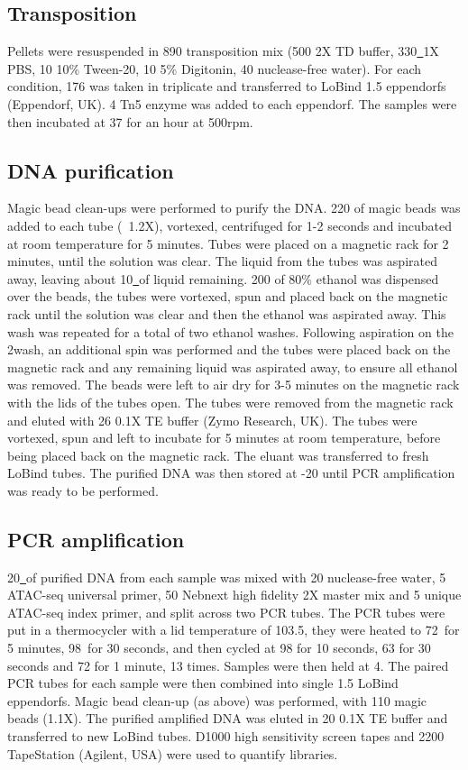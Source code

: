 \subsection{Transposition}
Pellets were resuspended in 890\ul{} transposition mix (500\ul{} 2X TD buffer, 330\ul\ 1X PBS, 10\ul{} 10\% Tween-20, 10\ul{} 5\% Digitonin, 40\ul{} nuclease-free water).
For each condition, 176\ul{} was taken in triplicate and transferred to LoBind 1.5\ml{} eppendorfs (Eppendorf, UK).
4\ul{} Tn5 enzyme was added to each eppendorf.
The samples were then incubated at 37\C{} for an hour at 500rpm.

\subsection{DNA purification}
Magic bead clean-ups were performed to purify the DNA.
220\ul{} of magic beads was added to each tube (~1.2X), vortexed, centrifuged for 1-2 seconds and incubated at room temperature for 5 minutes.
Tubes were placed on a magnetic rack for 2 minutes, until the solution was clear.
The liquid from the tubes was aspirated away, leaving about 10\ul\ of liquid remaining.
200\ul{} of 80\% ethanol was dispensed over the beads, the tubes were vortexed, spun and placed back on the magnetic rack until the solution was clear and then the ethanol was aspirated away.
This wash was repeated for a total of two ethanol washes.
Following aspiration on the 2\nd wash, an additional spin was performed and the tubes were placed back on the magnetic rack and any remaining liquid was aspirated away, to ensure all ethanol was removed.
The beads were left to air dry for 3-5 minutes on the magnetic rack with the lids of the tubes open.
The tubes were removed from the magnetic rack and eluted with 26\ul{} 0.1X TE buffer (Zymo Research, UK).
The tubes were vortexed, spun and left to incubate for 5 minutes at room temperature, before being placed back on the magnetic rack.
The eluant was transferred to fresh LoBind tubes.
The purified DNA was then stored at -20\C{} until PCR amplification was ready to be performed.

\subsection{PCR amplification}
20\ul\ of purified DNA from each sample was mixed with 20\ul{} nuclease-free water, 5\ul{} ATAC-seq universal primer, 50\ul{} Nebnext high fidelity 2X master mix and 5\ul{} unique ATAC-seq index primer, and split across two PCR tubes.
The PCR tubes were put in a thermocycler with a lid temperature of 103.5\C{}, they were heated to 72\C\ for 5 minutes, 98\C\ for 30 seconds, and then cycled at 98\C{} for 10 seconds, 63\C{} for 30 seconds and 72\C{} for 1 minute, 13 times.
Samples were then held at 4\C{}.
The paired PCR tubes for each sample were then combined into single 1.5\ml{} LoBind eppendorfs.
Magic bead clean-up (as above) was performed, with 110\ul{} magic beads (1.1X).
The purified amplified DNA was eluted in 20\ul{} 0.1X TE buffer and transferred to new LoBind tubes.
D1000 high sensitivity screen tapes and 2200 TapeStation (Agilent, USA) were used to quantify libraries.



